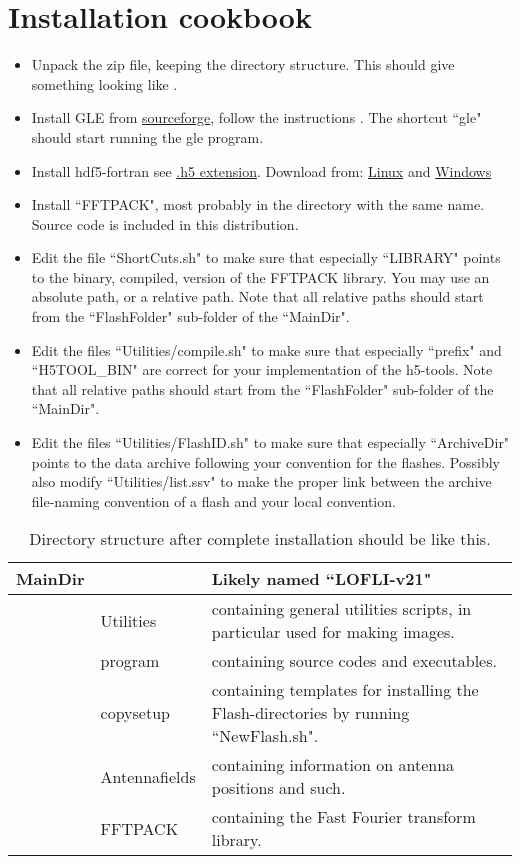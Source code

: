 \documentclass[fleqn,11pt]{book}
\begin{document}
\section{Installation cookbook}
\begin{itemize}
\item Unpack the zip file, keeping the directory structure. This should give something looking like .
\item Install GLE from \href{https://glx.sourceforge.io/index.html}{sourceforge}, follow the instructions \cite{GLE}. The shortcut ``gle" should start running the gle program. %
\item Install hdf5-fortran see \href{https://portal.hdfgroup.org/display/support}{.h5 extension}.  Download from: \href{https://www.hdfgroup.org/downloads/hdf5/}{Linux} and \href{https://support.hdfgroup.org/ftp/HDF5/releases/hdf5-1.6/hdf5-1.6.7/src/unpacked/release_docs/INSTALL_Windows.txt}{Windows}
\item Install ``FFTPACK", most probably in the directory with the same name. Source code is included in this distribution.
\item Edit the file ``ShortCuts.sh" to make sure that especially ``LIBRARY" points to the binary, compiled, version of the FFTPACK library. You may use an absolute path, or a relative path. Note that all relative paths should start from the ``FlashFolder" sub-folder of the ``MainDir".
\item Edit the files ``Utilities/compile.sh" to make sure that especially ``prefix" and ``H5TOOL\_BIN" are correct for your implementation of the h5-tools. Note that all relative paths should start from the ``FlashFolder" sub-folder of the ``MainDir".
\item Edit the files ``Utilities/FlashID.sh" to make sure that especially ``ArchiveDir" points to the data archive following your convention for the flashes. Possibly also modify ``Utilities/list.ssv" to make the proper link between the archive file-naming convention of a flash and your local convention.
\end{itemize}

\begin{table}[!ht]
\caption{Directory structure after complete installation should be like this. }
\begin{tabular}{|l l | p{10cm}|}
\hline
{MainDir} & &\multicolumn{1}{|l||}{Likely named ``LOFLI-v21"} \\
\hline
   & Utilities & containing general utilities scripts, in particular used for making images. \\
   & program &  containing source codes and executables. \\
   & copysetup & containing templates for installing the Flash-directories by running ``NewFlash.sh". \\
   & Antennafields & containing information on antenna positions and such. \\
   & FFTPACK & containing the Fast Fourier transform library. \\
\hline
\end{tabular}
\end{table}
\end{document}
